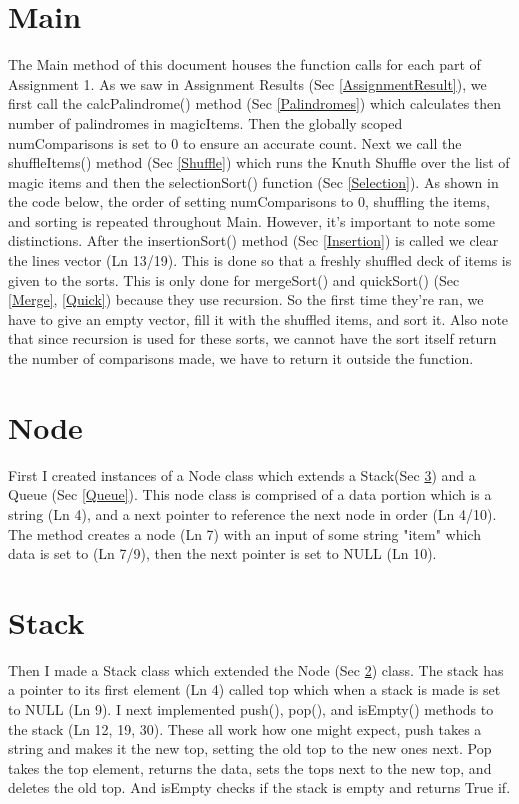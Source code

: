 \documentclass[12pt, letterpaper]{article}
\begin{document}
\section{Main} \label{Main}
The Main method of this document houses the function calls for each part of Assignment 1. As we saw in Assignment Results (Sec \ref{AssignmentResult}),
we first call the calcPalindrome() method (Sec \ref{Palindromes}) which calculates then number of palindromes in magicItems. Then the globally scoped numComparisons
is set to 0 to ensure an accurate count. Next we call the shuffleItems() method (Sec \ref{Shuffle}) which runs the Knuth Shuffle over the list of magic items and then the selectionSort() function (Sec \ref{Selection}).
As shown in the code below, the order of setting numComparisons to 0, shuffling the items, and sorting is repeated throughout Main. However, it's important to note some distinctions. After the
insertionSort() method (Sec \ref{Insertion}) is called we clear the lines vector (Ln 13/19). This is done so that a freshly shuffled deck of items is given to the sorts. 
This is only done for mergeSort() and quickSort() (Sec \ref{Merge}, \ref{Quick}) because they use recursion. So the first time they're ran, we have to give an empty vector, fill it with the shuffled items, and sort it.
Also note that since recursion is used for these sorts, we cannot have the sort itself return the number of comparisons made, we have to return it outside the function. 


\section{Node} \label{Node}
First I created instances of a Node class which extends a Stack(Sec \ref{Stack}) and a Queue (Sec \ref{Queue}).
This node class is comprised of a data portion which is a string (Ln 4), and a next pointer to reference the next node in order (Ln 4/10).
The method creates a node (Ln 7) with an input of some string "item" which data is set to (Ln 7/9), then the next pointer is set to NULL (Ln 10).


\section{Stack} \label{Stack}
Then I made a Stack class which extended the Node (Sec \ref{Node}) class. The stack has a pointer to its first element (Ln 4) called top which when a stack is made is set to NULL (Ln 9). I next implemented push(), pop(),
and isEmpty() methods to the stack (Ln 12, 19, 30). These all work how one might expect, push takes a string and makes it the new top, setting the old top to the new ones next. Pop takes the top element, returns the data, sets the
tops next to the new top, and deletes the old top. And isEmpty checks if the stack is empty and returns True if.

\end{document}
